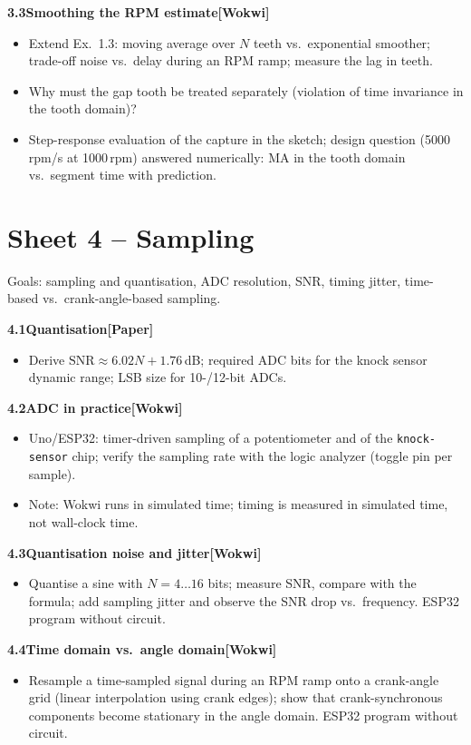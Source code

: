 \documentclass[11pt,a4paper]{article}
\newcommand{\W}{\textsf{\textbf{[Wokwi]}}}
\newcommand{\Pap}{\textsf{\textbf{[Paper]}}}
\newcommand{\exercise}[4]{%
  \par\smallskip\noindent\textbf{#1\quad #2}\hfill#3\par
  \nopagebreak\begin{itemize}[leftmargin=1.2em]#4\end{itemize}}
\begin{document}
\exercise{3.3}{Smoothing the RPM estimate}{\W}{
  \item Extend Ex.~1.3: moving average over $N$ teeth vs.\ exponential
    smoother; trade-off noise vs.\ delay during an RPM ramp; measure the
    lag in teeth.
  \item Why must the gap tooth be treated separately (violation of time
    invariance in the tooth domain)?
  \item Step-response evaluation of the capture in the sketch; design
    question (5000\,rpm/s at 1000\,rpm) answered numerically: MA in the
    tooth domain vs.\ segment time with prediction.}

\section{Sheet 4 -- Sampling}
\begin{sheetinfo}
Goals: sampling and quantisation, ADC resolution, SNR, timing jitter,
time-based vs.\ crank-angle-based sampling.
\end{sheetinfo}

\exercise{4.1}{Quantisation}{\Pap}{
  \item Derive $\mathrm{SNR}\approx 6.02N+1.76$\,dB; required ADC bits for
    the knock sensor dynamic range; LSB size for 10-/12-bit ADCs.}

\exercise{4.2}{ADC in practice}{\W}{
  \item Uno/ESP32: timer-driven sampling of a potentiometer and of the
    \texttt{knock-sensor} chip; verify the sampling rate with the logic
    analyzer (toggle pin per sample).
  \item Note: Wokwi runs in simulated time; timing is measured in
    simulated time, not wall-clock time.}

\exercise{4.3}{Quantisation noise and jitter}{\W}{
  \item Quantise a sine with $N=4\ldots16$ bits; measure SNR, compare with
    the formula; add sampling jitter and observe the SNR drop vs.\
    frequency. ESP32 program without circuit.}

\exercise{4.4}{Time domain vs.\ angle domain}{\W}{
  \item Resample a time-sampled signal during an RPM ramp onto a
    crank-angle grid (linear interpolation using crank edges); show that
    crank-synchronous components become stationary in the angle domain.
    ESP32 program without circuit.}
\end{document}
